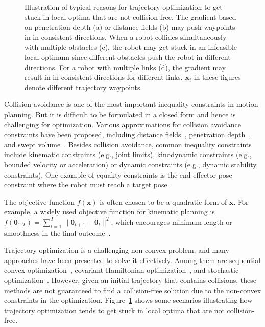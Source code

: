\documentclass[letterpaper, 10 pt, conference]{ieeeconf}  %
\newcommand{\x}{\mbox{$\mathbf x$}}
\newcommand{\btheta}{\mbox{$\bm \theta$}}
\begin{document}
\begin{figure}[!h]
\caption{Illustration of typical reasons for trajectory optimization to get stuck in local optima that are not collision-free. The gradient based on penetration depth (a) or distance fields (b) may push waypoints in in-consistent directions. When a robot collides simultaneously with multiple obstacles (c), the robot may get stuck in an infeasible local optimum since different obstacles push the robot in different directions. For a robot with multiple links (d), the gradient may result in in-consistent directions for different links. $\mathbf x_i$ in these figures denote different trajectory waypoints.}
\label{fig:badgradient}
\end{figure}


Collision avoidance is one of the most important inequality constraints in motion planning. But it is difficult to be formulated in a closed form and hence is challenging for optimization. Various approximations for collision avoidance constraints have been proposed, including distance fields~\cite{Khatib:1985:ROA, Ratliff:2009:CGO}, penetration depth~\cite{Cameron:1997:CMP}, and swept volume~\cite{Schulman:2013:FLO}. Besides collision avoidance, common inequality constraints include kinematic constraints (e.g., joint limits), kinodynamic constraints (e.g., bounded velocity or acceleration) or dynamic constraints (e.g., dynamic stability constraints). One example of equality constraints is the end-effector pose constraint where the robot must reach a target pose.

The objective function $f(\x)$ is often chosen to be a quadratic form of $\x$. For example, a widely used objective function for kinematic planning is $f(\btheta_{1:T}) = \sum_{t=1}^T \|\btheta_{t+1} - \btheta_{t}\|^2$, which encourages minimum-length or smoothness in the final outcome~\cite{Schulman:2013:FLO,Ratliff:2009:CGO}.

Trajectory optimization is a challenging non-convex problem, and many approaches have been presented to solve it effectively. Among them are sequential convex optimization~\cite{Schulman:2013:FLO}, covariant Hamiltonian optimization~\cite{Ratliff:2009:CGO}, and stochastic optimization~\cite{Kalakrishnan:2011:STOMP}. However, given an initial trajectory that contains collisions, these methods are not guaranteed to find a collision-free solution due to the non-convex constraints in the optimization. Figure~\ref{fig:badgradient} shows some scenarios illustrating how trajectory optimization tends to get stuck in local optima that are not collision-free. 
\end{document}
